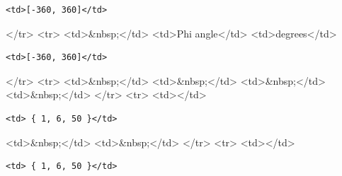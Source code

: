 \begin{verbatim}
<td>[-360, 360]</td>
\end{verbatim}

\textless{}/tr\textgreater{} \textless{}tr\textgreater{} \textless{}td\textgreater{}\&nbsp;\textless{}/td\textgreater{} \textless{}td\textgreater{}Phi angle\textless{}/td\textgreater{} \textless{}td\textgreater{}degrees\textless{}/td\textgreater{}

\begin{verbatim}
<td>[-360, 360]</td>
\end{verbatim}

\textless{}/tr\textgreater{} \textless{}tr\textgreater{} \textless{}td\textgreater{}\&nbsp;\textless{}/td\textgreater{} \textless{}td\textgreater{}\&nbsp;\textless{}/td\textgreater{} \textless{}td\textgreater{}\&nbsp;\textless{}/td\textgreater{} \textless{}td\textgreater{}\&nbsp;\textless{}/td\textgreater{} \textless{}/tr\textgreater{} \textless{}tr\textgreater{} \textless{}td\textgreater{}\textless{}/td\textgreater{}

\begin{verbatim}
<td> { 1, 6, 50 }</td>
\end{verbatim}

\textless{}td\textgreater{}\&nbsp;\textless{}/td\textgreater{} \textless{}td\textgreater{}\&nbsp;\textless{}/td\textgreater{} \textless{}/tr\textgreater{} \textless{}tr\textgreater{} \textless{}td\textgreater{}\textless{}/td\textgreater{}

\begin{verbatim}
<td> { 1, 6, 50 }</td>
\end{verbatim}

